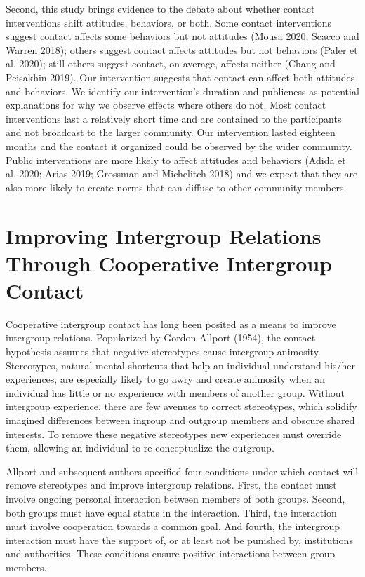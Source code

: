 \documentclass[11pt]{article}
\begin{document}
Second, this study brings evidence to the debate about whether contact
interventions shift attitudes, behaviors, or both. Some contact
interventions suggest contact affects some behaviors but not attitudes
(Mousa 2020; Scacco and Warren 2018); others suggest contact affects
attitudes but not behaviors (Paler et al. 2020); still others suggest
contact, on average, affects neither (Chang and Peisakhin 2019). Our
intervention suggests that contact can affect both attitudes and
behaviors. We identify our intervention's duration and publicness as
potential explanations for why we observe effects where others do not.
Most contact interventions last a relatively short time and are
contained to the participants and not broadcast to the larger community.
Our intervention lasted eighteen months and the contact it organized
could be observed by the wider community. Public interventions are more
likely to affect attitudes and behaviors (Adida et al. 2020; Arias 2019;
Grossman and Michelitch 2018) and we expect that they are also more
likely to create norms that can diffuse to other community members.

\hypertarget{improving-intergroup-relations-through-cooperative-intergroup-contact}{%
\section{Improving Intergroup Relations Through Cooperative Intergroup
Contact}\label{improving-intergroup-relations-through-cooperative-intergroup-contact}}

Cooperative intergroup contact has long been posited as a means to
improve intergroup relations. Popularized by Gordon Allport (1954), the
contact hypothesis assumes that negative stereotypes cause intergroup
animosity. Stereotypes, natural mental shortcuts that help an individual
understand his/her experiences, are especially likely to go awry and
create animosity when an individual has little or no experience with
members of another group. Without intergroup experience, there are few
avenues to correct stereotypes, which solidify imagined differences
between ingroup and outgroup members and obscure shared interests. To
remove these negative stereotypes new experiences must override them,
allowing an individual to re-conceptualize the outgroup.

Allport and subsequent authors specified four conditions under which
contact will remove stereotypes and improve intergroup relations. First,
the contact must involve ongoing personal interaction between members of
both groups. Second, both groups must have equal status in the
interaction. Third, the interaction must involve cooperation towards a
common goal. And fourth, the intergroup interaction must have the
support of, or at least not be punished by, institutions and
authorities. These conditions ensure positive interactions between group
members.
\end{document}
